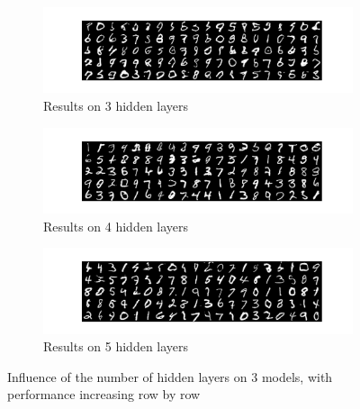 \documentclass[12pt,letterpaper]{article}
\begin{document}
\begin{figure}[h]
    \begin{subfigure}{0.49\textwidth}
    \includegraphics[width=\linewidth]{GAN_MNIST_0_100_256.png}
    \caption{\small Results on 3 hidden layers} \label{fig:a}
    \end{subfigure}\hspace*{\fill}
    \begin{subfigure}{0.49\textwidth}
    \includegraphics[width=\linewidth]{GAN_MNIST_1_100_256.png}
    \caption{\small Results on 4 hidden layers} \label{fig:b}
    \end{subfigure}

    \medskip
    \begin{subfigure}{0.49\textwidth}
    \includegraphics[width=\linewidth]{GAN_MNIST_2_100_256.png}
    \caption{\small Results on 5 hidden layers} \label{fig:c}
    \end{subfigure}\hspace*{\fill}
    \caption{Influence of the number of hidden layers on $3$ models, with performance increasing row by row} \label{fig:MNIST_GAN_hidden}
\end{figure}
\end{document}
